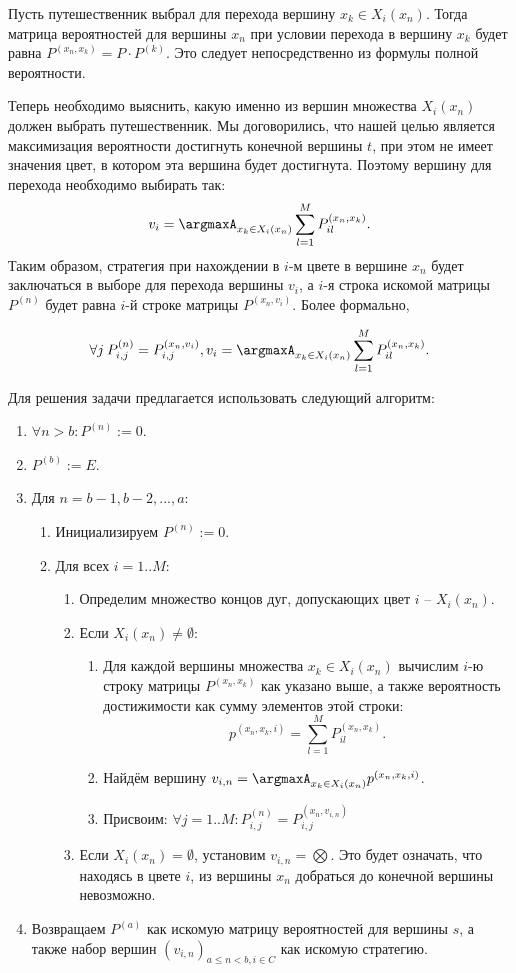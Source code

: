 \par Пусть путешественник выбрал для перехода вершину $x_k \in X_i(x_n)$. Тогда матрица вероятностей для вершины $x_n$ при условии перехода в вершину $x_k$ будет равна $P^{(x_n, x_k)} = P \cdot P^{(k)}$. Это следует непосредственно из формулы полной вероятности.
\par Теперь необходимо выяснить, какую именно из вершин множества $X_i(x_n)$ должен выбрать путешественник. Мы договорились, что нашей целью является максимизация вероятности достигнуть конечной вершины $t$, при этом не имеет значения цвет, в котором эта вершина будет достигнута. Поэтому вершину для перехода необходимо выбирать так: 
\[v_i = \argmaxA_{x_k \in X_i(x_n)} \sum_{l = 1}^{M} P^{(x_n, x_k)}_{il}.\]
Таким образом, стратегия при нахождении в $i$-м цвете в вершине $x_n$ будет заключаться в выборе для перехода вершины $v_i$, а $i$-я строка искомой матрицы $P^{(n)}$ будет равна $i$-й строке матрицы $P^{(x_n, v_i)}$. Более формально, 

\[\forall j \: P^{(n)}_{i, j} = P^{(x_n, v_i)}_{i, j}, v_i = \argmaxA_{x_k \in X_i(x_n)} \sum_{l = 1}^{M} P^{(x_n, x_k)}_{il}.\]

\par Для решения задачи предлагается использовать следующий алгоритм:
\begin{enumerate}
	\item $\forall n > b: P^{(n)} := 0$.
	\item $P^{(b)} := E$.
	\item Для $n = b - 1, b - 2, ..., a$:
	\begin{enumerate}
		\item Инициализируем $P^{(n)} := 0$.
		\item Для всех $i = 1..M$:
		\begin{enumerate}
			\item Определим множество концов дуг, допускающих цвет $i$ -- $X_i(x_n)$.
			\item Если $X_i(x_n) \ne \emptyset$:
			\begin{enumerate}
				\item Для каждой вершины множества $x_k \in X_i(x_n)$ вычислим \mbox{$i$-ю} строку матрицы $P^{(x_n, x_k)}$ как указано выше, а также вероятность достижимости как сумму элементов этой строки: 
				\[p^{(x_n, x_k, i)} = \sum_{l = 1}^{M} P^{(x_n, x_k)}_{il}.\]
				\item Найдём вершину $v_{i, n} = \argmaxA_{x_k \in X_i(x_n)} p^{(x_n, x_k, i)}$.
				\item Присвоим: $\forall j = 1..M \! \!: P^{(n)}_{i, j} = P^{(x_n, v_{i, n})}_{i, j}$
			\end{enumerate}
			\item Если $X_i(x_n) = \emptyset$, установим $v_{i, n} = \bigotimes$. Это будет означать, что находясь в цвете $i$, из вершины $x_n$ добраться до конечной вершины невозможно. 
		\end{enumerate}
	\end{enumerate} 
	\item Возвращаем $P^{(a)}$ как искомую матрицу вероятностей для вершины $s$, а также набор вершин $(v_{i, n})_{a \le n < b, i \in C}$ как искомую стратегию.
\end{enumerate}

